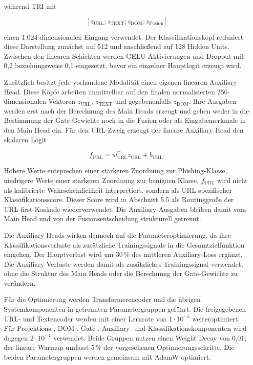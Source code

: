 während TRI mit

\[
[z_{\mathrm{URL}};z_{\mathrm{TEXT}};z_{\mathrm{DOM}};z_{\mathrm{Fusion}}]
\]

einen 1.024-dimensionalen Eingang verwendet. Der Klassifikationskopf reduziert diese
Darstellung zunächst auf 512 und anschließend auf 128 Hidden Units. Zwischen den linearen
Schichten werden GELU-Aktivierungen und Dropout mit 0,2 beziehungsweise 0,1 eingesetzt,
bevor ein einzelner Hauptlogit erzeugt wird.

Zusätzlich besitzt jede vorhandene Modalität einen eigenen linearen Auxiliary Head. Diese
Köpfe arbeiten unmittelbar auf den finalen normalisierten 256-dimensionalen Vektoren
$z_{\mathrm{URL}}$, $z_{\mathrm{TEXT}}$ und gegebenenfalls $z_{\mathrm{DOM}}$. Ihre
Ausgaben werden erst nach der Berechnung des Main Heads erzeugt und gehen weder in die
Bestimmung der Gate-Gewichte noch in die Fusion oder als Eingabemerkmale in den Main Head
ein. Für den URL-Zweig erzeugt der lineare Auxiliary Head den skalaren Logit

\[
f_{\mathrm{URL}}
=
w_{\mathrm{URL}}^{\top}z_{\mathrm{URL}} + b_{\mathrm{URL}}.
\]

Höhere Werte entsprechen einer stärkeren Zuordnung zur Phishing-Klasse, niedrigere Werte
einer stärkeren Zuordnung zur benignen Klasse. $f_{\mathrm{URL}}$ wird nicht als kalibrierte
Wahrscheinlichkeit interpretiert, sondern als URL-spezifischer Klassifikationsscore. Dieser
Score wird in Abschnitt 5.5 als Routinggröße der URL-first-Kaskade wiederverwendet. Die
Auxiliary-Ausgaben bleiben damit vom Main Head und von der Fusionsentscheidung strukturell
getrennt.

Die Auxiliary Heads wirken dennoch auf die Parameteroptimierung, da ihre
Klassifikationsverluste als zusätzliche Trainingssignale in die Gesamtzielfunktion eingehen.
Der Hauptverlust wird um 30\,\% des mittleren Auxiliary-Loss ergänzt. Die
Auxiliary-Verluste werden damit als zusätzliches Trainingssignal verwendet, ohne die Struktur
des Main Heads oder die Berechnung der Gate-Gewichte zu verändern.

Für die Optimierung werden Transformerencoder und die übrigen Systemkomponenten in
getrennten Parametergruppen geführt. Die freigegebenen URL- und Textencoder werden mit
einer Lernrate von $1\cdot10^{-5}$ weiteroptimiert. Für Projektions-, DOM-, Gate-,
Auxiliary- und Klassifikationskomponenten wird dagegen $2\cdot10^{-4}$ verwendet. Beide
Gruppen nutzen einen Weight Decay von 0,01; der lineare Warmup umfasst 5\,\% der
vorgesehenen Optimierungsschritte. Die beiden Parametergruppen werden gemeinsam mit AdamW
optimiert.

